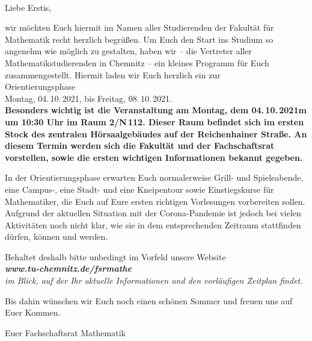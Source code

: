 \documentclass[nkz,einrichtung,usemycontact]{tucletter2019}
\begin{document}
	
\begin{letter}{%
\, \\
}

\opening{Liebe Erstis,}


wir möchten Euch hiermit im Namen aller Studierenden der Fakultät für Mathematik recht herzlich begrüßen.
Um Euch den Start ins Studium so angenehm wie möglich zu gestalten, haben wir -- die Vertreter aller Mathematikstudierenden in Chemnitz -- ein
kleines Programm für Euch zusammengestellt. Hiermit laden wir Euch herzlich ein zur \\[16pt]

\hspace*{\fill} \Large Orientierungsphase \hspace*{\fill} \\
\hspace*{\fill} Montag, 04.\,10.\,2021, bis Freitag, 08.\,10.\,2021. \normalsize \hspace*{\fill} \\[20pt]


\bfseries Besonders wichtig ist die Veranstaltung am Montag, dem 04.\,10.\,2021m um 10:30 Uhr im Raum 2/N\,112. Dieser Raum befindet sich im ersten Stock 
des zentralen Hörsaalgebäudes auf der Reichenhainer Straße. An diesem Termin werden sich die Fakultät und der Fachschaftsrat vorstellen, sowie 
die ersten wichtigen Informationen bekannt gegeben.\mdseries

\smallskip

In der Orientierungsphase erwarten Euch normalerweise Grill- und Spieleabende, eine Campus-, eine Stadt- und eine Kneipentour sowie Einstiegskurse für Mathematiker, die Euch auf Eure ersten richtigen Vorlesungen vorbereiten sollen. Aufgrund der aktuellen Situation mit der Corona-Pandemie ist jedoch bei vielen Aktivitäten noch nicht klar, wie sie in dem entsprechenden Zeitraum stattfinden dürfen, können und werden.

\smallskip

Behaltet deshalb bitte unbedingt im Vorfeld unsere Website \\[8pt]
\hspace*{\fill} \itshape\textbf{www.tu-chemnitz.de/fsrmathe} \upshape \hspace*{\fill} \\[8pt]
im Blick, auf der Ihr aktuelle Informationen und den vorläufigen Zeitplan findet.

\medskip

Bis dahin wünschen wir Euch noch einen schönen Sommer und freuen uns auf Euer Kommen.

\medskip

Euer Fachschaftsrat Mathematik

\end{letter}
\end{document}
